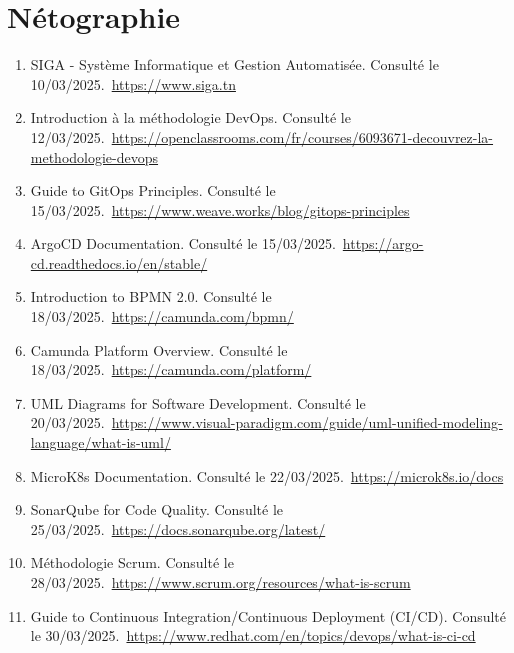 \chapter*{\centering Nétographie}
\bigskip


\begin{enumerate}
\item[ref1] SIGA - Système Informatique et Gestion Automatisée. Consulté le 10/03/2025.\
\url{https://www.siga.tn}

\item[ref2] Introduction à la méthodologie DevOps. Consulté le 12/03/2025.\
\url{https://openclassrooms.com/fr/courses/6093671-decouvrez-la-methodologie-devops}

\item[ref3] Guide to GitOps Principles. Consulté le 15/03/2025.\
\url{https://www.weave.works/blog/gitops-principles}

\item[ref4] ArgoCD Documentation. Consulté le 15/03/2025.\
\url{https://argo-cd.readthedocs.io/en/stable/}

\item[ref5] Introduction to BPMN 2.0. Consulté le 18/03/2025.\
\url{https://camunda.com/bpmn/}

\item[ref6] Camunda Platform Overview. Consulté le 18/03/2025.\
\url{https://camunda.com/platform/}

\item[ref7] UML Diagrams for Software Development. Consulté le 20/03/2025.\
\url{https://www.visual-paradigm.com/guide/uml-unified-modeling-language/what-is-uml/}

\item[ref8] MicroK8s Documentation. Consulté le 22/03/2025.\
\url{https://microk8s.io/docs}

\item[ref9] SonarQube for Code Quality. Consulté le 25/03/2025.\
\url{https://docs.sonarqube.org/latest/}

\item[ref10] Méthodologie Scrum. Consulté le 28/03/2025.\
\url{https://www.scrum.org/resources/what-is-scrum}

\item[ref11] Guide to Continuous Integration/Continuous Deployment (CI/CD). Consulté le 30/03/2025.\
\url{https://www.redhat.com/en/topics/devops/what-is-ci-cd}


\end{enumerate}
